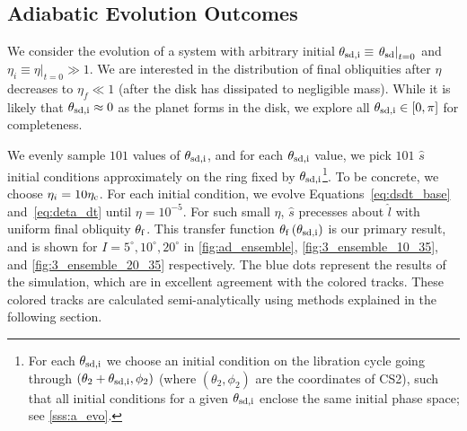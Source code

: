 \documentclass[
        fleqn,
        usenatbib,
        referee,
    ]{mnras}
\newcommand*{\at}[1]{\left.#1\right|}
\newcommand*{\p}[1]{\left(#1\right)}
\begin{document}
\subsection{Adiabatic Evolution Outcomes}\label{ss:ad_ensemble}

We consider the evolution of a system with arbitrary initial $\theta_{\rm sd, i}
\equiv \at{\theta_{\rm sd}}_{t = 0}$ and $\eta_i \equiv \at{\eta}_{t = 0} \gg
1$. We are interested in the distribution of final obliquities after $\eta$
decreases to $\eta_f \ll 1$ (after the disk has dissipated to negligible mass).
While it is likely that $\theta_{\rm sd, i} \approx 0$ as the planet forms in
the disk, we explore all $\theta_{\rm sd, i} \in [0, \pi]$ for completeness.

We evenly sample $101$ values of $\theta_{\rm sd, i}$, and for each $\theta_{\rm
sd, i}$ value, we pick $101$ $\hat{s}$ initial conditions approximately on the
ring fixed by $\theta_{\rm sd, i}$\footnote{For each $\theta_{\rm sd, i}$ we
choose an initial condition on the libration cycle going through $\p{\theta_2 +
\theta_{\rm sd, i}, \phi_2}$ (where $\p{\theta_2, \phi_2}$ are the coordinates
of CS2), such that all initial conditions for a given $\theta_{\rm sd, i}$
enclose the same initial phase space; see \autoref{sss:a_evo}.}. To be concrete,
we choose $\eta_i = 10\eta_{\rm c}$. For each initial condition, we evolve
Equations~\ref{eq:dsdt_base} and~\ref{eq:deta_dt} until $\eta = 10^{-5}$. For
such small $\eta$, $\hat{s}$ precesses about $\hat{l}$ with uniform final
obliquity $\theta_{\rm f}$. This transfer function $\theta_{\rm f}\p{\theta_{\rm
sd, i}}$ is our primary result, and is shown for $I = 5^\circ, 10^\circ,
20^\circ$ in \autoref{fig:ad_ensemble}, \autoref{fig:3_ensemble_10_35}, and
\autoref{fig:3_ensemble_20_35} respectively. The blue dots represent the results
of the simulation, which are in excellent agreement with the colored tracks.
These colored tracks are calculated semi-analytically using methods explained in
the following section.
\end{document}
